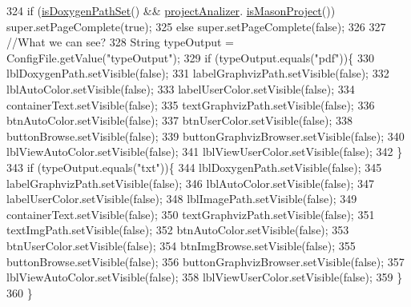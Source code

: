 \begin{DoxyCode}
324         \textcolor{keywordflow}{if} (\hyperlink{classit_1_1isislab_1_1masonhelperdocumentation_1_1mason_1_1wizards_1_1_b___project_information_page_a0eec0bf0cf4211e377555c20f52abdb8}{isDoxygenPathSet}() && \hyperlink{classit_1_1isislab_1_1masonhelperdocumentation_1_1mason_1_1wizards_1_1_b___project_information_page_aa0397b2de6a01a90d6d2eb52645f5173}{projectAnalizer}.
      \hyperlink{classit_1_1isislab_1_1masonhelperdocumentation_1_1analizer_1_1_project_analizer_a57a1bbfb21c09b106d6fa90ad3709d35}{isMasonProject}()) super.setPageComplete(\textcolor{keyword}{true});
325         \textcolor{keywordflow}{else}    super.setPageComplete(\textcolor{keyword}{false});
326         
327         \textcolor{comment}{//What we can see?}
328         String typeOutput = ConfigFile.getValue(\textcolor{stringliteral}{"typeOutput"});
329         \textcolor{keywordflow}{if} (typeOutput.equals(\textcolor{stringliteral}{"pdf"}))\{
330             lblDoxygenPath.setVisible(\textcolor{keyword}{false});
331             labelGraphvizPath.setVisible(\textcolor{keyword}{false});
332             lblAutoColor.setVisible(\textcolor{keyword}{false});
333             labelUserColor.setVisible(\textcolor{keyword}{false});
334             containerText.setVisible(\textcolor{keyword}{false});
335             textGraphvizPath.setVisible(\textcolor{keyword}{false});
336             btnAutoColor.setVisible(\textcolor{keyword}{false});
337             btnUserColor.setVisible(\textcolor{keyword}{false});
338             buttonBrowse.setVisible(\textcolor{keyword}{false});
339             buttonGraphvizBrowser.setVisible(\textcolor{keyword}{false});
340             lblViewAutoColor.setVisible(\textcolor{keyword}{false});
341             lblViewUserColor.setVisible(\textcolor{keyword}{false});
342         \}
343         \textcolor{keywordflow}{if} (typeOutput.equals(\textcolor{stringliteral}{"txt"}))\{
344             lblDoxygenPath.setVisible(\textcolor{keyword}{false});
345             labelGraphvizPath.setVisible(\textcolor{keyword}{false});
346             lblAutoColor.setVisible(\textcolor{keyword}{false});
347             labelUserColor.setVisible(\textcolor{keyword}{false});
348             lblImagePath.setVisible(\textcolor{keyword}{false});
349             containerText.setVisible(\textcolor{keyword}{false});
350             textGraphvizPath.setVisible(\textcolor{keyword}{false});
351             textImgPath.setVisible(\textcolor{keyword}{false});
352             btnAutoColor.setVisible(\textcolor{keyword}{false});
353             btnUserColor.setVisible(\textcolor{keyword}{false});
354             btnImgBrowse.setVisible(\textcolor{keyword}{false});
355             buttonBrowse.setVisible(\textcolor{keyword}{false});
356             buttonGraphvizBrowser.setVisible(\textcolor{keyword}{false});
357             lblViewAutoColor.setVisible(\textcolor{keyword}{false});
358             lblViewUserColor.setVisible(\textcolor{keyword}{false});
359         \}   
360     \}
\end{DoxyCode}


